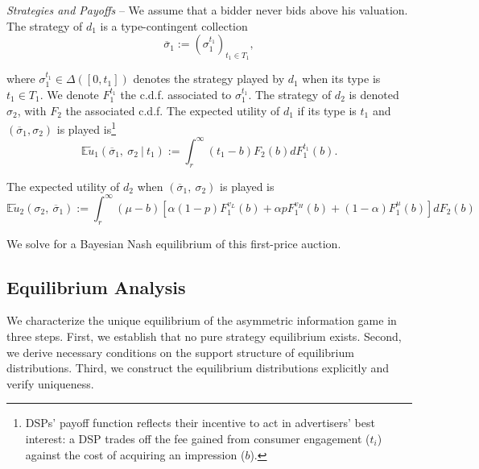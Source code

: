 \documentclass[11pt]{article}
\theoremstyle{plain}
\theoremstyle{definition}
\theoremstyle{plain}
\theoremstyle{plain}
\theoremstyle{plain}
\theoremstyle{plain}
\numberwithin{equation}{section}
\begin{document}
\noindent \textit{Strategies and Payoffs} -- We assume that a bidder never bids above his valuation. The strategy of $ d_1 $ is a type-contingent collection
\begin{equation*}
 \overline{\sigma}_1 := \left(\sigma_1^{t_1}\right)_{t_1 \in T_1},    
\end{equation*}
  
\noindent where $ \sigma_1^{t_1} \in \Delta\left([0, t_1]\right) $ denotes the strategy played by $ d_1 $ when its type is $ t_1 \in T_1 $. We denote $ F_1^{t_1} $ the c.d.f. associated to $ \sigma_1^{t_1} $. The strategy of $ d_2 $ is denoted $ \sigma_2 $, with $ F_2 $ the associated c.d.f. The expected utility of $ d_1 $ if its type is $ t_1 $ and $ \left( \overline{\sigma}_1, \sigma_2 \right) $ is played is\footnote{DSPs' payoff function reflects their incentive to act in advertisers' best interest: a DSP trades off the fee gained from consumer engagement ($t_i$) against the cost of acquiring an impression ($b$).}
\begin{equation*}
 \mathbb{E}\tilde{u}_1 \left( \overline{\sigma}_1, \ \sigma_2 \ \big| \ t_1  \right) := \int_{r}^{\infty} (t_1 - b) F_2(b) d F_1^{t_1}(b).    
\end{equation*}

\vspace{0.2cm}

\noindent  The expected utility of $ d_2 $ when $ \left( \overline{\sigma}_1,\ \sigma_2 \right) $ is played is
\begin{equation*}
\mathbb{E}\tilde{u}_2 \left( \sigma_2,\ \overline{\sigma}_1 \right) := \int_{r}^{\infty} (\mu - b) \left[ \alpha (1 - p) F_1^{v_L}(b) + \alpha p F_1^{v_H}(b) + (1 - \alpha) F_1^{\mu}(b) \right] d F_2(b)
\end{equation*}

\vspace{0.2cm}

\noindent We solve for a Bayesian Nash equilibrium of this first-price auction.
\vspace{0.4cm}

\subsection{Equilibrium Analysis}
\noindent We characterize the unique equilibrium of the asymmetric information game in three steps. First, we establish that no pure strategy equilibrium exists. Second, we derive necessary conditions on the support structure of equilibrium distributions. Third, we construct the equilibrium distributions explicitly and verify uniqueness.
\end{document}
